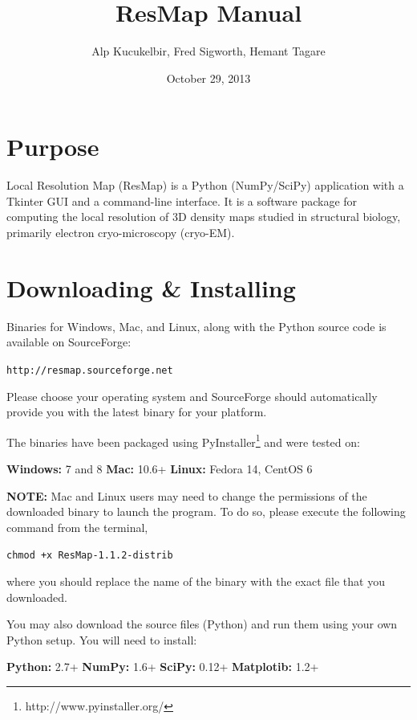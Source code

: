 \documentclass[10pt]{article}
\title{ResMap Manual\break {\normalsize\texttt{[version 1.1.2]}}}
\author{Alp Kucukelbir, Fred Sigworth, Hemant Tagare}
\date{October 29, 2013}
\begin{document}
\maketitle

\tableofcontents

\section{Purpose}
Local Resolution Map (ResMap) is a Python (NumPy/SciPy) application with a Tkinter GUI and a command-line interface. It is a software package for computing the local resolution of 3D density maps studied in structural biology, primarily electron cryo-microscopy (cryo-EM).

\newpage

\section{Downloading \& Installing}
\label{downloadAndInstall}
Binaries for Windows, Mac, and Linux, along with the Python source code is available on SourceForge:
\begin{center}
	\textcolor{NavyBlue}{\texttt{http://resmap.sourceforge.net}}
\end{center}

Please choose your operating system and SourceForge should automatically provide you with the latest binary for your platform.

The binaries have been packaged using PyInstaller\footnote{http://www.pyinstaller.org/} and were tested on:
\begin{center}
	\textbf{Windows:} 7 and 8 \quad	\textbf{Mac:} 10.6+ \quad \textbf{Linux:} Fedora 14, CentOS 6
\end{center}

\textcolor{RedOrange}{\textbf{NOTE:}} Mac and Linux users may need to change the permissions of the downloaded binary to launch the program. To do so, please execute the following command from the terminal,
\begin{center}
	\textcolor{NavyBlue}{\texttt{chmod +x ResMap-1.1.2-distrib}}
\end{center}
where you should replace the name of the binary with the exact file that you downloaded.

You may also download the source files (Python) and run them using your own Python setup. You will need to install:
\begin{center}
	\textbf{Python:} 2.7+ \quad	\textbf{NumPy:} 1.6+ \quad \textbf{SciPy:} 0.12+ \quad \textbf{Matplotib:} 1.2+
\end{center}
\end{document}
